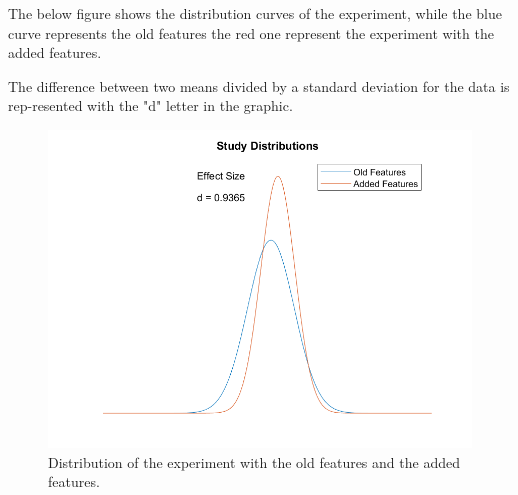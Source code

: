 \documentclass[a4paper, 12pt]{ppgeb}
\begin{document}
\begin{table}[h]
\centering
\caption{Quantitative indicators obtained with the comparison between the new features added to the old features sets with feature reduction algorithms.}\label{tab:Quantitative indicators new features}
\end{table}

The below figure shows the distribution curves of the experiment, while the blue curve represents the old features the red one represent the experiment with the added features.

The difference between two means divided by a standard deviation for the data is rep-resented with the "d" letter in the graphic.

\begin{figure}[h]
	\centering
	\includegraphics[width=.8\linewidth]{Study_Distributions.png}
	\caption{Distribution of the experiment with the old features and the added features.} \label{fig1}
\end{figure}
\end{document}
